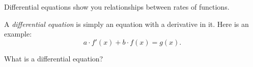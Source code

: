 \documentclass{ximera}
\begin{document}
  Differential equations show you relationships between rates of
  functions.



A \textit{differential equation} is
simply an equation with a derivative in it. Here is an example:
\[
a\cdot f'(x)+ b\cdot f(x) = g(x). 
\]
\begin{question}
  What is a differential equation?
  \begin{multipleChoice}
  \end{multipleChoice}
\end{question}
\end{document}
